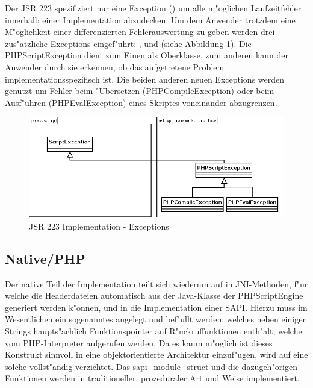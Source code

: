 Der JSR 223 spezifiziert nur eine Exception () um alle m"oglichen Laufzeitfehler innerhalb einer 
Implementation abzudecken. Um dem Anwender trotzdem eine M"oglichkeit einer differenzierten Fehlerauswertung zu geben werden drei
zus"atzliche Exceptions eingef"uhrt: ,  und  (siehe Abbildung
\ref{fig:jsr223exceptions}). Die PHPScriptException dient zum Einen als Oberklasse, zum anderen kann der Anwender durch sie erkennen, ob
das aufgetretene Problem implementationsspezifisch ist. Die beiden anderen neuen Exceptions werden genutzt um Fehler beim "Ubersetzen 
(PHPCompileException) oder beim Ausf"uhren (PHPEvalException) eines Skriptes voneinander abzugrenzen.

\begin{figure}[h]
\includegraphics[width=\textwidth]{chap1/img/exceptions.png}
\caption{JSR 223 Implementation - Exceptions}
\label{fig:jsr223exceptions}
\end{figure}

\subsection{Native/PHP}
\label{sec:chap1:design:native}

Der native Teil der Implementation teilt sich wiederum auf in JNI-Methoden, f"ur welche die Headerdateien automatisch aus
der Java-Klasse der PHPScriptEngine generiert werden k"onnen, und in die Implementation einer SAPI. Hierzu muss im
Wesentlichen ein sogenanntes  angelegt und bef"ullt werden, welches neben einigen Strings
haupts"achlich Funktionspointer auf R"uckruffunktionen enth"alt, welche vom PHP-Interpreter aufgerufen werden. Da es
kaum m"oglich ist dieses Konstrukt sinnvoll in eine objektorientierte Architektur einzuf"ugen, wird auf eine solche
vollst"andig verzichtet. Das sapi\_module\_struct und die dazugeh"origen Funktionen werden in traditioneller,
prozeduraler Art und Weise implementiert.

